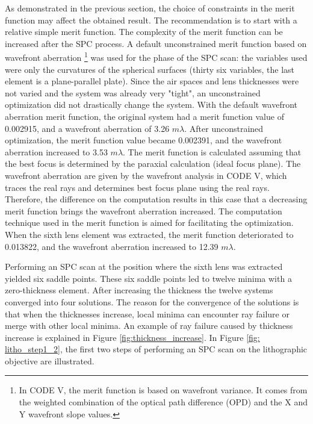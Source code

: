 As demonstrated in the previous section, the choice of constraints in the merit function may affect the obtained result. The recommendation is to start with a relative simple merit function. The complexity of the merit function can be increased after the SPC process. A default unconstrained merit function based on wavefront aberration \footnote{In CODE V, the merit function is based on wavefront variance. It comes from the weighted combination of the optical path difference (OPD) and the X and Y wavefront slope values.} was used for the phase of the SPC scan: the variables used were only the curvatures of the spherical surfaces (thirty six variables, the last element is a plane-parallel plate). Since the air spaces and lens thicknesses were not varied and the system was already very "tight", an unconstrained optimization did not drastically change the system. With the default wavefront aberration merit function, the original system had a merit function value of 0.002915, and a wavefront aberration of 3.26 $m\lambda$. After unconstrained optimization, the merit function value became 0.002391, and the wavefront aberration increased to 3.53 $m\lambda$. The merit function is calculated assuming that the best focus is determined by the paraxial calculation (ideal focus plane). The wavefront aberration are given by the wavefront analysis in CODE V, which traces the real rays and determines best focus plane using the real rays. Therefore, the difference on the computation results in this case that a decreasing merit function brings the wavefront aberration increased. The computation technique used in the merit function is aimed for facilitating the optimization. When the sixth lens element was extracted, the merit function deteriorated to 0.013822, and the wavefront aberration increased to 12.39 $m\lambda$.

Performing an SPC scan at the position where the sixth lens was extracted yielded six saddle points. These six saddle points led to twelve minima with a zero-thickness element. After increasing the thickness the twelve systems converged into four solutions. The reason for the convergence of the solutions is that when the thicknesses increase, local minima can encounter ray failure or merge with other local minima. An example of ray failure caused by thickness increase is explained in Figure \ref{fig:thickness_increase}. In Figure \ref{fig: litho_step1_2}, the first two steps of performing an SPC scan on the lithographic objective are illustrated.

